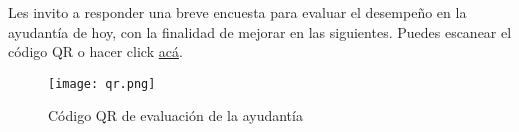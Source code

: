 \noindent Les invito a responder una breve encuesta para evaluar el desempeño en la ayudantía de hoy, con la finalidad de mejorar en las siguientes. Puedes escanear el código QR o hacer click \href{https://forms.gle/mcJ643DcNXVB5iNu9}{acá}.

\begin{figure}[H]
    \centering
    \texttt{[image: qr.png]}
    \caption{Código QR de evaluación de la ayudantía}
    \label{fig:qr}
\end{figure}


